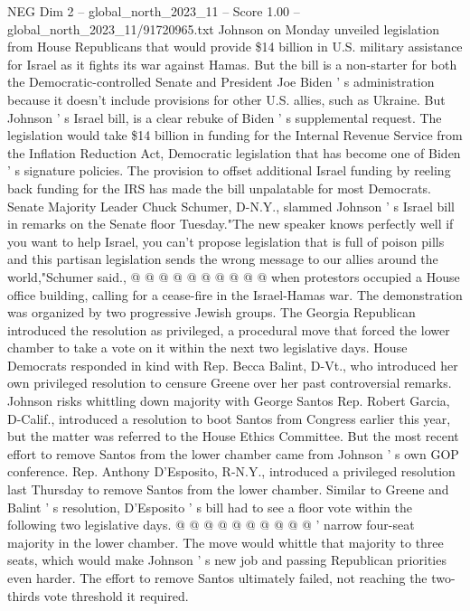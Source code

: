 \begin{textsample}{NEG Dim 2 – global\_north\_2023\_11 – Score 1.00 – global\_north\_2023\_11/91720965.txt}  \label{ex:f2_neg_140}
Johnson on Monday unveiled legislation from House Republicans that would provide \$14 billion in U.S. military assistance for Israel as it fights its war against Hamas.
But the bill is a non-starter for both the Democratic-controlled Senate and President Joe Biden ' s administration because it doesn't include provisions for other U.S. allies, such as Ukraine.
But Johnson ' s Israel bill, is a clear rebuke of Biden ' s supplemental request.
The legislation would take \$14 billion in funding for the Internal Revenue Service from the Inflation Reduction Act, Democratic legislation that has become one of Biden ' s signature policies.
The provision to offset additional Israel funding by reeling back funding for the IRS has made the bill unpalatable for most Democrats.
Senate Majority Leader Chuck Schumer, D-N.Y., slammed Johnson ' s Israel bill in remarks on the Senate floor Tuesday."The new speaker knows perfectly well if you want to help Israel, you can't propose legislation that is full of poison pills and this partisan legislation sends the wrong message to our allies around the world,"Schumer said., @ @ @ @ @ @ @ @ @ @ when protestors occupied a House office building, calling for a cease-fire in the Israel-Hamas war.
The demonstration was organized by two progressive Jewish groups.
The Georgia Republican introduced the resolution as privileged, a procedural move that forced the lower chamber to take a vote on it within the next two legislative days.
House Democrats responded in kind with Rep.
Becca Balint, D-Vt., who introduced her own privileged resolution to censure Greene over her past controversial remarks.
Johnson risks whittling down majority with George Santos Rep.
Robert Garcia, D-Calif., introduced a resolution to boot Santos from Congress earlier this year, but the matter was referred to the House Ethics Committee.
But the most recent effort to remove Santos from the lower chamber came from Johnson ' s own GOP conference.
Rep.
Anthony D'Esposito, R-N.Y., introduced a privileged resolution last Thursday to remove Santos from the lower chamber.
Similar to Greene and Balint ' s resolution, D'Esposito ' s bill had to see a floor vote within the following two legislative days. @ @ @ @ @ @ @ @ @ @ ' narrow four-seat majority in the lower chamber.
The move would whittle that majority to three seats, which would make Johnson ' s new job and passing Republican priorities even harder.
The effort to remove Santos ultimately failed, not reaching the two-thirds vote threshold it required.

\end{textsample}
